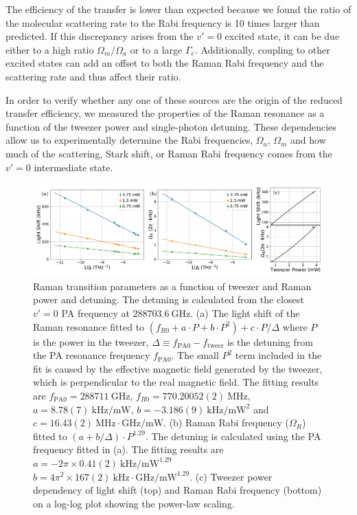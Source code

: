 \documentclass[aps,prl,twocolumn,10pt,superscriptaddress]{revtex4-1}
\begin{document}
The efficiency of the transfer is lower than expected
because we found the ratio of the molecular scattering rate to the Rabi frequency
is 10 times larger than predicted. If this discrepancy arises from the $v'=0$ excited state,
it can be due either to a high ratio $\Omega_m / \Omega_a$ or to a large $\Gamma_e$.
Additionally, coupling to other excited states can add an offset to
both the Raman Rabi frequency and the scattering rate and thus affect their ratio.

In order to verify whether any one of these sources are the origin of the reduced transfer efficiency,
we measured the properties of the Raman resonance as a function of the tweezer power and single-photon detuning.
These dependencies allow us to experimentally determine the Rabi frequencies,
$ \Omega_a $, $\Omega_m $ and how much of the scattering, Stark shift,
or Raman Rabi frequency comes from the $ v' = 0$ intermediate state.

\begin{figure}
  \includegraphics[width=\textwidth]{imgs/fig-det.pdf}
  \caption{Raman transition parameters as a function of tweezer and Raman power and detuning.
    The detuning is calculated from the closest $v'=0$ PA frequency at $288703.6~\mathrm{GHz}$.
    (a) The light shift of the Raman resonance fitted to
    $(f_{R0}+a\cdot P+b\cdot P^2)+c\cdot P/\Delta$
    where $P$ is the power in the tweezer,
    $\Delta\equiv f_{\mathrm{PA}0} - f_{\mathrm{tweer}}$ is the detuning from
    the PA resonance frequency $f_{\mathrm{PA}0}$.
    The small $P^2$ term included in the fit is caused by the effective magnetic field
    generated by the tweezer, which is perpendicular to the real magnetic field.
    The fitting results are $f_{\mathrm{PA}0}=288711~\mathrm{GHz}$,
    $f_{R0}=770.20052(2)~\mathrm{MHz}$, $a=8.78(7)~\mathrm{kHz/mW}$,
    $b=-3.186(9)~\mathrm{kHz/mW^2}$
    and $c=16.43(2)~\mathrm{MHz\cdot GHz/mW}$.
    (b) Raman Rabi frequency ($\Omega_R$) fitted to $(a + b/\Delta)\cdot P^{1.29}$.
    The detuning is calculated using the PA frequency fitted in (a).
    The fitting results are $a=-2\pi\times\!0.41(2)~\mathrm{kHz/mW^{1.29}}$
    $b=4\pi^2\times\!167(2)~\mathrm{kHz\cdot\!GHz/mW^{1.29}}$.
    (c) Tweezer power dependency of light shift (top) and Raman Rabi frequency (bottom)
    on a log-log plot showing the power-law scaling.
    \label{f-det}}
\end{figure}
\end{document}
